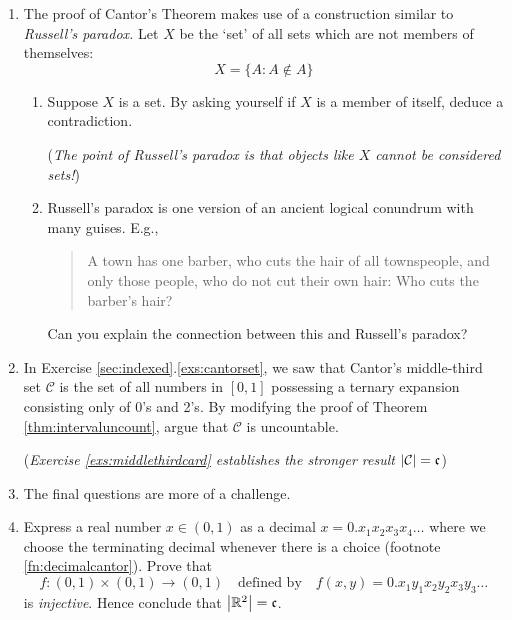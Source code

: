 \begin{exercises}{}{}
\begin{enumerate}
 	
   	\item The proof of Cantor's Theorem makes use of a construction similar to \emph{Russell's paradox.} Let $X$ be the `set' of all sets which are not members of themselves:
  	\[
  		X=\{A:A\not\in A\}
  	\]
  	\begin{enumerate}
    	\item Suppose $X$ is a set. By asking yourself if $X$ is a member of itself, deduce a contradiction.\par
    	(\emph{The point of Russell's paradox is that objects like $X$ cannot be considered sets!})
    	\item Russell's paradox is one version of an ancient logical conundrum with many guises. E.g.,
    	\begin{quote}
    		A town has one barber, who cuts the hair of all townspeople, and only those people, who do not cut their own hair: Who cuts the barber's hair?
    	\end{quote}
    	Can you explain the connection between this and Russell's paradox?
  	\end{enumerate}
  	
  
		\item In Exercise \ref*{sec:indexed}.\ref{exs:cantorset}, we saw that Cantor's middle-third set $\mathcal C$ is the set of all numbers in $[0,1]$ possessing a ternary expansion consisting only of 0's and 2's. By modifying the proof of Theorem \ref{thm:intervaluncount}, argue that $\mathcal C$ is uncountable.\par
		(\emph{Exercise \ref{exs:middlethirdcard} establishes the stronger result $\left| \mathcal C\right|=\mathfrak{c}$})
  
  
  	\goodbreak
  	
  	
  	\item[]The final questions are more of a challenge.
  	
  	
  	\item Express a real number $x\in(0,1)$ as a decimal $x=0.x_1x_2x_3x_4\ldots$	where we choose the terminating decimal whenever there is a choice (footnote \ref{fn:decimalcantor}). Prove that
  	\[
  		f:(0,1)\times (0,1)\to (0,1)
  		\quad\text{defined by}\quad
  		f(x,y)=0.x_1y_1x_2y_2x_3y_3\ldots
  	\]
  	is \emph{injective}. Hence conclude that $\left| \mathbb{R}^2\right|=\mathfrak{c}$.
		

\end{enumerate}
\end{exercises}
